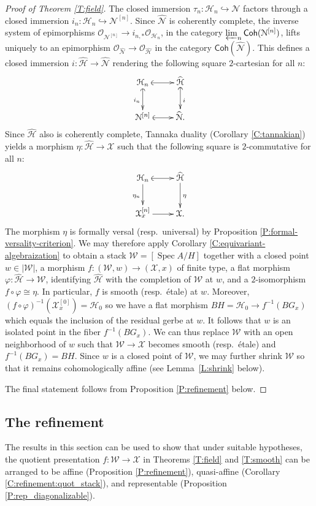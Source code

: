 \documentclass[a4paper]{amsart}
\theoremstyle{plain}
\theoremstyle{definition}
\theoremstyle{remark}
\numberwithin{equation}{section}
\newcommand{\inj}{\hookrightarrow} %
\newcommand\cH{\mathcal{H}}
\newcommand\cN{\mathcal{N}}
\newcommand\cW{\mathcal{W}}
\newcommand\cX{\mathcal{X}}
\newcommand\oh{\mathcal{O}}
\newcommand\co{\colon}
\newcommand\Coh{\mathsf{Coh}}
\DeclareMathOperator{\Spec}{Spec}
\renewcommand{\hat}{\widehat}
\begin{document}
\begin{proof}[Proof of Theorem \ref{T:field}]
The closed immersion $\tau_n\colon \cH_n \inj \cN$ factors through a
closed immersion $i_n\colon \cH_n \inj \cN^{[n]}$. 
Since $\hat{\cN}$ is coherently complete, the inverse system of epimorphisms $\oh_{\cN^{[n]}} \to i_{n,*}\oh_{\cH_n}$, in the category $\varprojlim_n \Coh(\cN^{[n]})$, lifts uniquely to an epimorphism $\oh_{\hat{\cN}} \to \oh_{\hat{\cH}}$ in the category $\Coh(\hat{\cN})$. This defines a closed immersion $i\colon \hat{\cH} \to \hat{\cN}$ rendering the following square $2$-cartesian for all $n$:
\[
\xymatrix{
\cH_n \ar@{(->}[d]_{i_n} \ar@{(->}[r]	& \hat{\cH} \ar@{(->}[d]^i\\
\cN^{[n]} \ar@{(->}[r] 		& \hat{\cN}.
}
\]
Since $\hat{\cH}$ also is coherently complete, Tannaka duality (Corollary \ref{C:tannakian}) yields a morphism $\eta\co \hat{\cH} \to \cX$ such that the following square is
$2$-commutative for all $n$:
\[
\xymatrix{
\cH_n \ar[d]_{\eta_n} \ar@{(->}[r]	& \hat{\cH} \ar[d]^{\eta} \\
\cX_x^{[n]} \ar[r]					& \cX.
}
\]
The morphism $\eta$ is formally versal (resp.\ universal) by Proposition \ref{P:formal-versality-criterion}. We may therefore apply Corollary \ref{C:equivariant-algebraization} to obtain a stack $\cW=[\Spec A/H]$ together with a closed point $w\in |\cW|$, a morphism $f\co (\cW,w)\to (\cX,x)$
of finite type, a flat morphism $\varphi\co \hat{\cH}\to \cW$, identifying $\hat{\cH}$ with the
completion of $\cW$ at $w$, and a $2$-isomorphism $f\circ\varphi\cong \eta$. In particular, $f$ is smooth (resp.\ \'etale)
at $w$. Moreover, $(f\circ \varphi)^{-1}(\cX_x^{[0]})=\cH_0$ so we have a
flat morphism $BH=\cH_0\to f^{-1}(BG_x)$ which equals the inclusion of the
residual gerbe at $w$. It follows that $w$ is an isolated point in the fiber
$f^{-1}(BG_x)$. We can thus replace $\cW$ with an open neighborhood of $w$
such that $\cW\to \cX$ becomes smooth (resp.\ \'etale) and
$f^{-1}(BG_x) = BH$. Since $w$ is a closed point of $\cW$, we may further shrink
$\cW$ so that it remains cohomologically affine (see Lemma~\ref{L:shrink} below).

The final statement follows from Proposition \ref{P:refinement} below.
\end{proof}


 \subsection{The refinement}  The results in this section can be used to show
  that under suitable hypotheses, the quotient presentation $f\colon \cW \to \cX$ in Theorems \ref{T:field} and \ref{T:smooth}
can be arranged to be affine (Proposition \ref{P:refinement}), quasi-affine (Corollary \ref{C:refinement:quot_stack}), and representable (Proposition \ref{P:rep_diagonalizable}).
 
\end{document}
